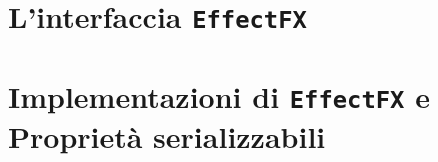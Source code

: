 
\appendix

        \chapter{L'interfaccia \texttt{EffectFX}}\label{appendix:effectfx}


        \chapter{Implementazioni di \texttt{EffectFX} e Proprietà serializzabili}\label{appendix:effectsAndProps}
